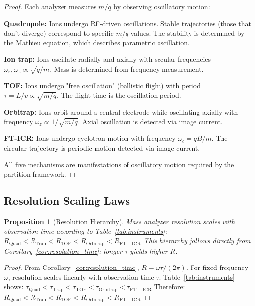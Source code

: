 \documentclass[twocolumn,10pt]{article}
\newtheorem{proposition}[theorem]{Proposition}
\begin{document}
\begin{proof}
Each analyzer measures $m/q$ by observing oscillatory motion:

\textbf{Quadrupole:} Ions undergo RF-driven oscillations. Stable trajectories (those that don't diverge) correspond to specific $m/q$ values. The stability is determined by the Mathieu equation, which describes parametric oscillation.

\textbf{Ion trap:} Ions oscillate radially and axially with secular frequencies $\omega_r, \omega_z \propto \sqrt{q/m}$. Mass is determined from frequency measurement.

\textbf{TOF:} Ions undergo "free oscillation" (ballistic flight) with period $\tau = L/v \propto \sqrt{m/q}$. The flight time is the oscillation period.

\textbf{Orbitrap:} Ions orbit around a central electrode while oscillating axially with frequency $\omega_z \propto 1/\sqrt{m/q}$. Axial oscillation is detected via image current.

\textbf{FT-ICR:} Ions undergo cyclotron motion with frequency $\omega_c = qB/m$. The circular trajectory is periodic motion detected via image current.

All five mechanisms are manifestations of oscillatory motion required by the partition framework.
\end{proof}



\subsection{Resolution Scaling Laws}

\begin{proposition}[Resolution Hierarchy]
\label{prop:resolution_hierarchy}
Mass analyzer resolution scales with observation time according to Table~\ref{tab:instruments}:
$
R_{\mathrm{Quad}} < R_{\mathrm{Trap}} < R_{\mathrm{TOF}} < R_{\mathrm{Orbitrap}} < R_{\mathrm{FT-ICR}}
$
This hierarchy follows directly from Corollary~\ref{cor:resolution_time}: longer $\tau$ yields higher $R$.
\end{proposition}

\begin{proof}
From Corollary~\ref{cor:resolution_time}, $R = \omega\tau/(2\pi)$. For fixed frequency $\omega$, resolution scales linearly with observation time $\tau$. Table~\ref{tab:instruments} shows:
$
\tau_{\mathrm{Quad}} < \tau_{\mathrm{Trap}} < \tau_{\mathrm{TOF}} < \tau_{\mathrm{Orbitrap}} < \tau_{\mathrm{FT-ICR}}
$
Therefore:
$
R_{\mathrm{Quad}} < R_{\mathrm{Trap}} < R_{\mathrm{TOF}} < R_{\mathrm{Orbitrap}} < R_{\mathrm{FT-ICR}}
$
\end{proof}
\end{document}

